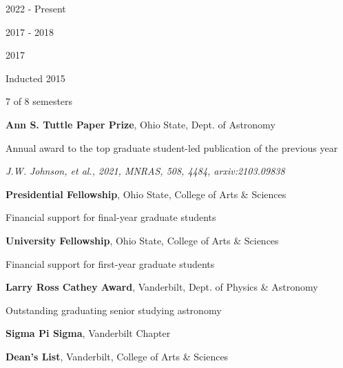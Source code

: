\documentclass[cv.tex]{subfiles}
\begin{document}
\parbox{0.18\textwidth}{%
	 \par
	\null \par
	\null \par
	2022 - Present \par
	\null \par
	2017 - 2018 \par
	\null \par
	2017 \par
	\null \par
	Inducted 2015 \par
	7 of 8 semesters
}
\hspace{1mm}
\parbox{0.8\textwidth}{%
	\vspace{1mm}
	\textbf{Ann S. Tuttle Paper Prize}, Ohio State, Dept. of Astronomy \par
	Annual award to the top graduate student-led publication of the previous
	year \par
	\textit{J.W. Johnson, et al., 2021, MNRAS, 508, 4484, arxiv:2103.09838} \par
	\textbf{Presidential Fellowship}, Ohio State, College of Arts \& Sciences
	\par
	Financial support for final-year graduate students \par
	\textbf{University Fellowship}, Ohio State, College of Arts \& Sciences \par
	Financial support for first-year graduate students \par
	\textbf{Larry Ross Cathey Award}, Vanderbilt, Dept. of Physics \& Astronomy
	\par
	Outstanding graduating senior studying astronomy \par
	\textbf{Sigma Pi Sigma}, Vanderbilt Chapter
	\par
	\textbf{Dean's List}, Vanderbilt, College of Arts \& Sciences
}
\end{document}
